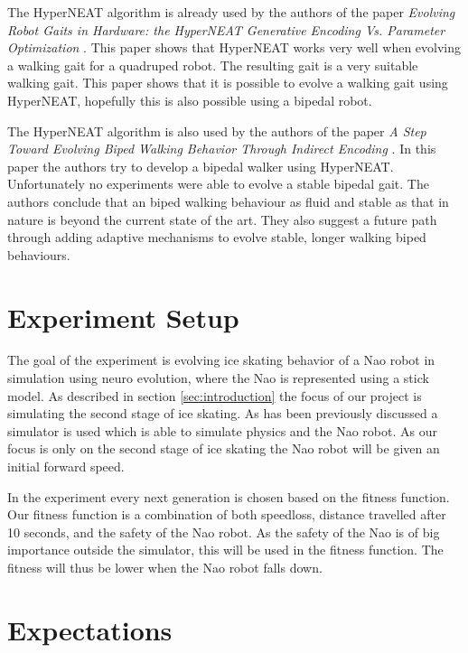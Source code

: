\documentclass[10pt]{article}
\begin{document}
The HyperNEAT algorithm is already used by the authors of the paper \emph{Evolving Robot Gaits in Hardware: the HyperNEAT Generative Encoding Vs. Parameter Optimization} \cite{Yosinski2011EvolvedGaits}. This paper shows that HyperNEAT works very well when evolving a walking gait for a quadruped robot. The resulting gait is a very suitable walking gait. This paper shows that it is possible to evolve a walking gait using HyperNEAT, hopefully this is also possible using a bipedal robot.

The HyperNEAT algorithm is also used by the authors of the paper \emph{A Step Toward Evolving Biped Walking Behavior Through Indirect Encoding} \cite{steptowardevolvingbipedwalkingbehavior}. In this paper the authors try to develop a bipedal walker using HyperNEAT. Unfortunately no experiments were able to evolve a stable bipedal gait. The authors conclude that an biped walking behaviour as fluid and stable as that in nature is beyond the current state of the art. They also suggest a future path through adding adaptive mechanisms to evolve stable, longer walking biped behaviours. 

\section{Experiment Setup}
The goal of the experiment is evolving ice skating behavior of a Nao robot in simulation using neuro evolution, where the Nao is represented using a stick model. As described in section \ref{sec:introduction} the focus of our project is simulating the second stage of ice skating. As has been previously discussed a simulator is used which is able to simulate physics and the Nao robot. As our focus is only on the second stage of ice skating the Nao robot will be given an initial forward speed. 
 
In the experiment every next generation is chosen based on the fitness function. Our fitness function is a combination of both speedloss, distance travelled after 10 seconds, and the safety of the Nao robot. As the safety of the Nao is of big importance outside the simulator, this will be used in the fitness function. The fitness will thus be lower when the Nao robot falls down. 

\section{Expectations}



\end{document}
